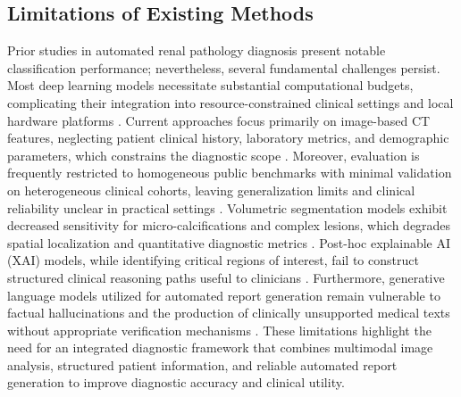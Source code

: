 \documentclass[]{elsarticle}
\begin{document}
\subsection{Limitations of Existing Methods} 
Prior studies in automated renal pathology diagnosis present notable classification performance; nevertheless, several fundamental challenges persist. Most deep learning models necessitate substantial computational budgets, complicating their integration into resource-constrained clinical settings and local hardware platforms \cite{lecun2015deep, litjens2017survey}. Current approaches focus primarily on image-based CT features, neglecting patient clinical history, laboratory metrics, and demographic parameters, which constrains the diagnostic scope \cite{kumar2024comprehensive, hossain2025detection, kermany2018identifying}. Moreover, evaluation is frequently restricted to homogeneous public benchmarks with minimal validation on heterogeneous clinical cohorts, leaving generalization limits and clinical reliability unclear in practical settings \cite{hossain2025detection, dataset_kaggle}. Volumetric segmentation models exhibit decreased sensitivity for micro-calcifications and complex lesions, which degrades spatial localization and quantitative diagnostic metrics \cite{kumar2024comprehensive, aburass2025vision}. Post-hoc explainable AI (XAI) models, while identifying critical regions of interest, fail to construct structured clinical reasoning paths useful to clinicians \cite{holzinger2019causability, selvaraju2017grad}. Furthermore, generative language models utilized for automated report generation remain vulnerable to factual hallucinations and the production of clinically unsupported medical texts without appropriate verification mechanisms \cite{liu2024bootstrapping, sloan2024automated}. These limitations highlight the need for an integrated diagnostic framework that combines multimodal image analysis, structured patient information, and reliable automated report generation to improve diagnostic accuracy and clinical utility.
\end{document}
